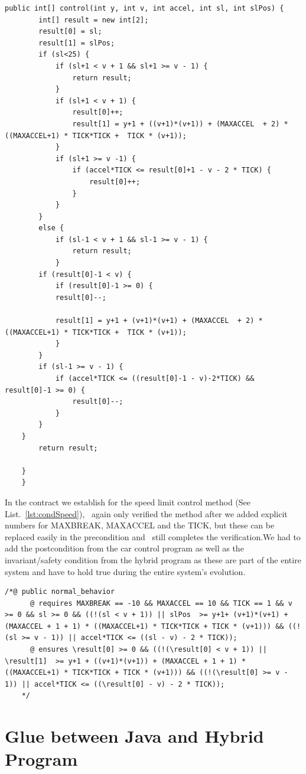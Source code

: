 \begin{lstlisting}[label=lst:programSpeed]
public int[] control(int y, int v, int accel, int sl, int slPos) {
		int[] result = new int[2];
		result[0] = sl;
		result[1] = slPos;
		if (sl<25) {
			if (sl+1 < v + 1 && sl+1 >= v - 1) {
				return result;
			}
			if (sl+1 < v + 1) {
				result[0]++;
				result[1] = y+1 + ((v+1)*(v+1)) + (MAXACCEL  + 2) * ((MAXACCEL+1) * TICK*TICK +  TICK * (v+1));
			}
			if (sl+1 >= v -1) {
				if (accel*TICK <= result[0]+1 - v - 2 * TICK) {
					result[0]++;
				}
			}
		}
		else {
			if (sl-1 < v + 1 && sl-1 >= v - 1) {
				return result;
			}
		if (result[0]-1 < v) {
			if (result[0]-1 >= 0) {
			result[0]--;
			
			result[1] = y+1 + (v+1)*(v+1) + (MAXACCEL  + 2) * ((MAXACCEL+1) * TICK*TICK +  TICK * (v+1));
			}
		}
		if (sl-1 >= v - 1) {
			if (accel*TICK <= ((result[0]-1 - v)-2*TICK) && result[0]-1 >= 0) {
				result[0]--;
			}
		}
	}
		return result;

	}
	}
\end{lstlisting}


In the contract we establish for the speed limit control method (See List.~\ref{lst:condSpeed}), \key~again only verified the method after we added explicit numbers for MAXBREAK, MAXACCEL and the TICK, but these can be replaced easily in the precondition and \key~still completes the verification.We had to add the postcondition from the car control program as well as the invariant/safety condition from the hybrid program as these are part of the entire system and have to hold true during the entire system's evolution.
\newpage
\begin{lstlisting}[label=lst:condSpeed]
/*@ public normal_behavior
	  @ requires MAXBREAK == -10 && MAXACCEL == 10 && TICK == 1 && v >= 0 && sl >= 0 && ((!(sl < v + 1)) || slPos  >= y+1+ (v+1)*(v+1) + (MAXACCEL + 1 + 1) * ((MAXACCEL+1) * TICK*TICK + TICK * (v+1))) && ((!(sl >= v - 1)) || accel*TICK <= ((sl - v) - 2 * TICK));
	  @ ensures \result[0] >= 0 && ((!(\result[0] < v + 1)) || \result[1]  >= y+1 + ((v+1)*(v+1)) + (MAXACCEL + 1 + 1) * ((MAXACCEL+1) * TICK*TICK + TICK * (v+1))) && ((!(\result[0] >= v - 1)) || accel*TICK <= ((\result[0] - v) - 2 * TICK));
	*/
\end{lstlisting}

\section{Glue between Java and Hybrid Program}
\label{sec:traffic:glue}

